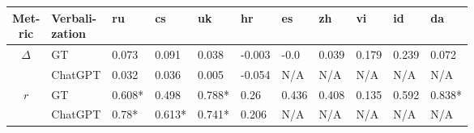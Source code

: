 \begin{tabular}{|cl|llll|lllll|}
\hline
 \makecell{Met-\\ric}      & \makecell{Verbali-\\zation}   & ru     & cs     & uk     &     hr & es    & zh    & vi    & id    & da     \\
\hline
 \multirow{2}{*}{$\Delta$} & GT                            & 0.073  & 0.091  & 0.038  & -0.003 & -0.0  & 0.039 & 0.179 & 0.239 & 0.072  \\
                           & ChatGPT                       & 0.032  & 0.036  & 0.005  & -0.054 & N/A   & N/A   & N/A   & N/A   & N/A    \\
 \multirow{2}{*}{$r$}      & GT                            & 0.608* & 0.498  & 0.788* &  0.26  & 0.436 & 0.408 & 0.135 & 0.592 & 0.838* \\
                           & ChatGPT                       & 0.78*  & 0.613* & 0.741* &  0.206 & N/A   & N/A   & N/A   & N/A   & N/A    \\
\hline
\end{tabular}